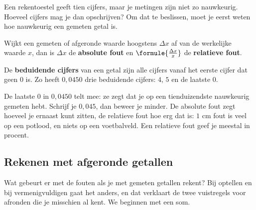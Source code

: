 Een rekentoestel geeft tien cijfers, maar je metingen zijn niet zo nauwkeurig. Hoeveel cijfers mag je dan opschrijven? Om dat te beslissen, moet je eerst weten hoe nauwkeurig een gemeten getal is.

\begin{theorie}
Wijkt een gemeten of afgeronde waarde hoogstens $\Delta x$ af van de werkelijke waarde $x$, dan is $\Delta x$ de \textbf{\textcolor{accent}{absolute fout}} en $\formule{\frac{\Delta x}{x}}$ de \textbf{\textcolor{accent}{relatieve fout}}.

\vspace{1mm}
De \textbf{\textcolor{accent}{beduidende cijfers}} van een getal zijn alle cijfers vanaf het eerste cijfer dat geen $0$ is. Zo heeft $0{,}0450$ drie beduidende cijfers: $4$, $5$ en de laatste $0$.
\end{theorie}

De laatste $0$ in $0{,}0450$ telt mee: ze zegt dat je op een tienduizendste nauwkeurig gemeten hebt. Schrijf je $0{,}045$, dan beweer je minder. De absolute fout zegt hoeveel je ernaast kunt zitten, de relatieve fout hoe erg dat is: $1$ cm fout is veel op een potlood, en niets op een voetbalveld. Een relatieve fout geef je meestal in procent.


\begin{oefeningen}
\end{oefeningen}

\subsection{Rekenen met afgeronde getallen}\label{sec:h3-rekenen}

Wat gebeurt er met de fouten als je met gemeten getallen rekent? Bij optellen en bij vermenigvuldigen gaat het anders, en dat verklaart de twee vuistregels voor afronden die je misschien al kent. We beginnen met een som.

